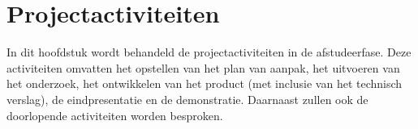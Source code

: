 \chapter{Projectactiviteiten}
In dit hoofdstuk wordt behandeld de projectactiviteiten in de afstudeerfase.
Deze activiteiten omvatten het opstellen van het plan van aanpak, het uitvoeren van het onderzoek, het ontwikkelen van het product (met inclusie van het technisch verslag), de eindpresentatie en de demonstratie.
Daarnaast zullen ook de doorlopende activiteiten worden besproken.





